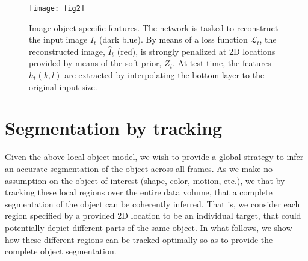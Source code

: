 \begin{figure}[t]
\centering
\texttt{[image: fig2]}
\caption{Image-object specific features. The network is tasked to reconstruct the input image $I_t$ (dark blue). By means of a loss function $\mathcal{L}_t$, the reconstructed image, $\hat{I}_t$ (red), is strongly penalized at 2D locations provided by means of the soft prior, $Z_t$. At test time, the features $h_t(k,l)$ are extracted by interpolating the bottom layer to the original input size.
}
\label{fig:unet}
\end{figure}

\section{Segmentation by tracking} \label{sec:optimization}
Given the above local object model, we wish to provide a global strategy to infer an accurate segmentation of the object across all frames. As we make no assumption on the object of interest (\eg shape, color, motion, etc.), we  that by tracking these local regions over the entire data volume, that a complete segmentation of the object can be coherently inferred. That is, we consider each region specified by a provided 2D location to be an individual target, that could potentially depict different parts of the same object. In what follows, we show how these different regions can be tracked optimally so as to provide the complete object segmentation.


